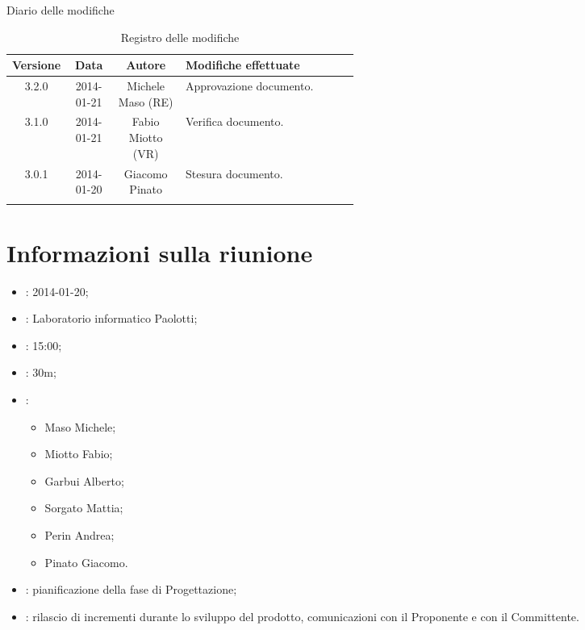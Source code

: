 
\newpage
Diario delle modifiche
\begin{center}
\begin{longtable}{|c|c|c|p{0.5\linewidth}|}
\toprule
\textbf{Versione} & \textbf{Data} & \textbf{Autore} & \textbf{Modifiche effettuate}\\

\midrule
3.2.0 & 2014-01-21 & Michele Maso (RE)  & Approvazione documento.\\
\midrule
3.1.0 & 2014-01-21 & Fabio Miotto (VR) & Verifica documento.\\
\midrule
3.0.1 & 2014-01-20 & Giacomo Pinato & Stesura documento.\\

\bottomrule
\caption{Registro delle modifiche}
\label{tab:changelog}
\end{longtable}
\end{center}

\newpage
\tableofcontents


\newpage
\section{Informazioni sulla riunione}%
\label{1.0}
\begin{itemize}
\item {}: 2014-01-20;
\item {}: Laboratorio informatico Paolotti;
\item {}: 15:00;
\item {}: 30m;
\item {}: \NomeGruppo{}
\begin{itemize}
\item Maso Michele;
\item Miotto Fabio;
\item Garbui Alberto;
\item Sorgato Mattia;
\item Perin Andrea;
\item Pinato Giacomo.
\end{itemize}
\item {}: pianificazione della fase di Progettazione;
\item {}: rilascio di incrementi durante lo sviluppo del prodotto, comunicazioni con il Proponente e con il Committente.
\end{itemize}

